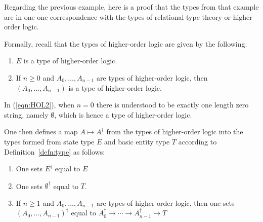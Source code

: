 \documentclass{lmcs} %
\begin{document}
\begin{proofdetail}

Regarding the previous example, here is a proof that the types from that example are in one-one correspondence with the types of relational type theory or higher-order logic.

Formally, recall that the types of higher-order logic are given by the following:
\begin{enumerate}[label=(\alph*), ref = \alph*, align=left, leftmargin=*]
    \item\label{eqn:HOL1} $E$ is a type of higher-order logic.
    \item\label{eqn:HOL2} If $n\geq 0$ and $A_0, \ldots, A_{n-1}$ are types of higher-order logic, then $(A_0, \ldots, A_{n-1})$ is a type of higher-order logic.
\end{enumerate}
In (\ref{eqn:HOL2}), when $n=0$ there is understood to be exactly one length zero string, namely $\emptyset$, which is hence a type of higher-order logic.

One then defines a map $A\mapsto A^{\dag}$ from the types of higher-order logic into the types formed from state type $E$ and basic entity type $T$ according to Definition~\ref{defn:type} as follows:
\begin{enumerate}[label=(\roman*), ref = \roman*, align=left, leftmargin=*]
    \item\label{eqn:dag1} One sets $E^{\dag}$ equal to $E$
    \item\label{eqn:dag2} One sets $\emptyset^{\dag}$ equal to $T$.
    \item\label{eqn:dag3} If $n\geq 1$ and $A_0, \ldots, A_{n-1}$ are types of higher-order logic, then one sets $(A_0, \ldots, A_{n-1})^{\dag}$ equal to $A_0^{\dag}\rightarrow \cdots \rightarrow A_{n-1}^{\dag}\rightarrow T$
\end{enumerate}


\end{proofdetail}
\end{document}
